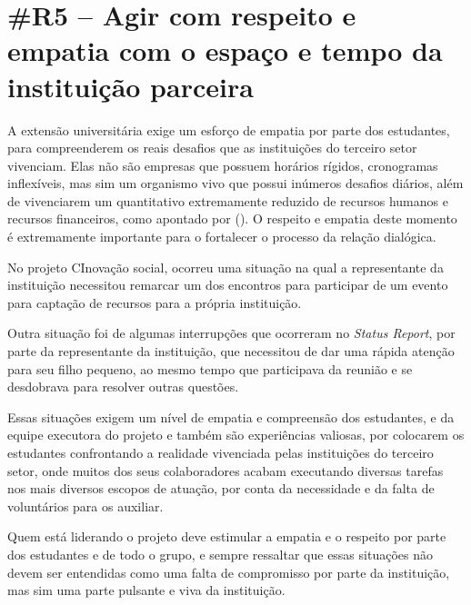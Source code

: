 \section*{\#R5 – Agir com respeito e empatia com o espaço e tempo da instituição parceira}

A extensão universitária exige um esforço de empatia por parte dos estudantes, para compreenderem os reais desafios que as instituições do terceiro setor vivenciam. Elas não são empresas que possuem horários rígidos, cronogramas inflexíveis, mas sim um organismo vivo que possui inúmeros desafios diários, além de vivenciarem um quantitativo extremamente reduzido de recursos humanos e recursos financeiros, como apontado por \citeauthor{gama2023} (\citeyear{gama2023}). O respeito e empatia deste momento é extremamente importante para o fortalecer o processo da relação dialógica.

No projeto CInovação social, ocorreu uma situação na qual a representante da instituição necessitou remarcar um dos encontros para participar de um evento para captação de recursos para a própria instituição. 

Outra situação foi de algumas interrupções que ocorreram no \textit{Status Report}, por parte da representante da instituição, que necessitou de dar uma rápida atenção para seu filho pequeno, ao mesmo tempo que participava da reunião e se desdobrava para resolver outras questões. 

Essas situações exigem um nível de empatia e compreensão dos estudantes, e da equipe executora do projeto e também são experiências valiosas, por colocarem os estudantes confrontando a realidade vivenciada pelas instituições do terceiro setor, onde muitos dos seus colaboradores acabam executando diversas tarefas nos mais diversos escopos de atuação, por conta da necessidade e da falta de voluntários para os auxiliar.

Quem está liderando o projeto deve estimular a empatia e o respeito por parte dos estudantes e de todo o grupo, e sempre ressaltar que essas situações não devem ser entendidas como uma falta de compromisso por parte da instituição, mas sim uma parte pulsante e viva da instituição.
